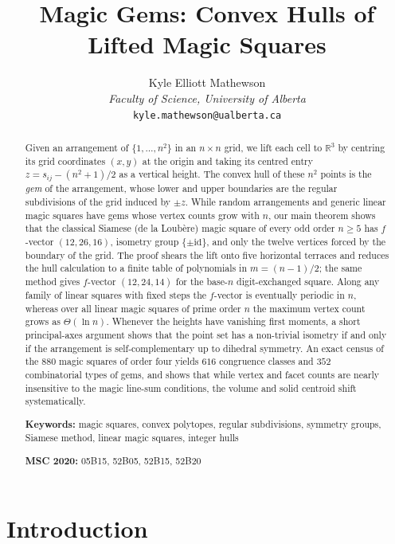 \documentclass[11pt,a4paper]{article}
\title{\textbf{Magic Gems: Convex Hulls of Lifted Magic Squares}}
\author{Kyle Elliott Mathewson\\
\textit{Faculty of Science, University of Alberta}\\
\texttt{kyle.mathewson@ualberta.ca}}
\date{}
\theoremstyle{plain}
\theoremstyle{definition}
\theoremstyle{remark}
\newcommand{\R}{\mathbb{R}}
\begin{document}
\maketitle

\begin{abstract}
Given an arrangement of $\{1,\dots,n^2\}$ in an $n\times n$ grid, we lift each cell to $\R^3$ by centring its grid coordinates $(x,y)$ at the origin and taking its centred entry $z = s_{ij} - (n^2+1)/2$ as a vertical height. The convex hull of these $n^2$ points is the \emph{gem} of the arrangement, whose lower and upper boundaries are the regular subdivisions of the grid induced by $\pm z$. While random arrangements and generic linear magic squares have gems whose vertex counts grow with $n$, our main theorem shows that the classical Siamese (de la Loub\`ere) magic square of every odd order $n\ge5$ has $f$-vector $(12,26,16)$, isometry group $\{\pm\mathrm{id}\}$, and only the twelve vertices forced by the boundary of the grid. The proof shears the lift onto five horizontal terraces and reduces the hull calculation to a finite table of polynomials in $m=(n-1)/2$; the same method gives $f$-vector $(12,24,14)$ for the base-$n$ digit-exchanged square. Along any family of linear squares with fixed steps the $f$-vector is eventually periodic in $n$, whereas over all linear magic squares of prime order $n$ the maximum vertex count grows as $\Theta(\ln n)$. Whenever the heights have vanishing first moments, a short principal-axes argument shows that the point set has a non-trivial isometry if and only if the arrangement is self-complementary up to dihedral symmetry. An exact census of the $880$ magic squares of order four yields $616$ congruence classes and $352$ combinatorial types of gems, and shows that while vertex and facet counts are nearly insensitive to the magic line-sum conditions, the volume and solid centroid shift systematically.
\medskip

\noindent\textbf{Keywords:} magic squares, convex polytopes, regular subdivisions, symmetry groups, Siamese method, linear magic squares, integer hulls

\noindent\textbf{MSC 2020:} 05B15, 52B05, 52B15, 52B20
\end{abstract}

\section{Introduction}
\label{sec:introduction}
\end{document}
